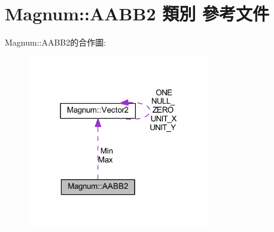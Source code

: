 \hypertarget{class_magnum_1_1_a_a_b_b2}{}\section{Magnum\+:\+:A\+A\+B\+B2 類別 參考文件}
\label{class_magnum_1_1_a_a_b_b2}


Magnum\+:\+:A\+A\+B\+B2的合作圖\+:\nopagebreak
\begin{figure}[H]
\begin{center}
\leavevmode
\includegraphics[width=226pt]{class_magnum_1_1_a_a_b_b2__coll__graph}
\end{center}
\end{figure}
